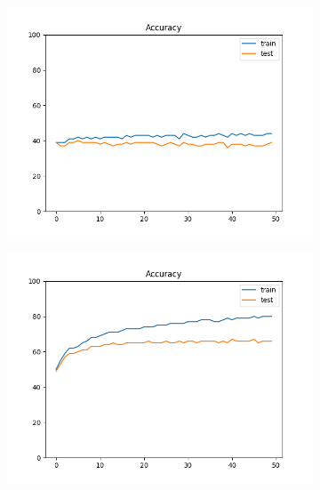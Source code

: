 \documentclass[12pt]{article}
\begin{document}
\begin{figure}
\begin{subfigure}{0.16\textwidth}
    \centering
    \includegraphics[width=\linewidth]{accuracies_2_2_1.png}
  \end{subfigure}
  \begin{subfigure}{0.16\textwidth}
    \centering
    \includegraphics[width=\linewidth]{accuracies_2_3_bs4.png}
  \end{subfigure}


\end{figure}
\end{document}
